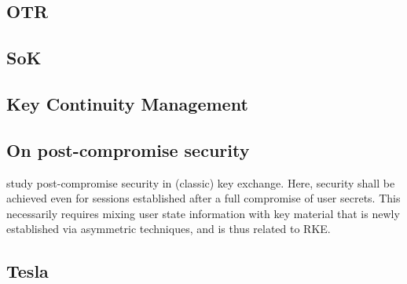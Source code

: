 	\subsection{OTR}
\subsection{SoK}
\subsection{Key Continuity Management}
\subsection{On post-compromise security}
study post-compromise security 	in (classic) key exchange. Here, security shall be achieved even for sessions established after a full compromise of user secrets. This necessarily requires mixing user state information with key material that is newly established via asymmetric techniques, and is thus related to RKE.
\subsection{Tesla}